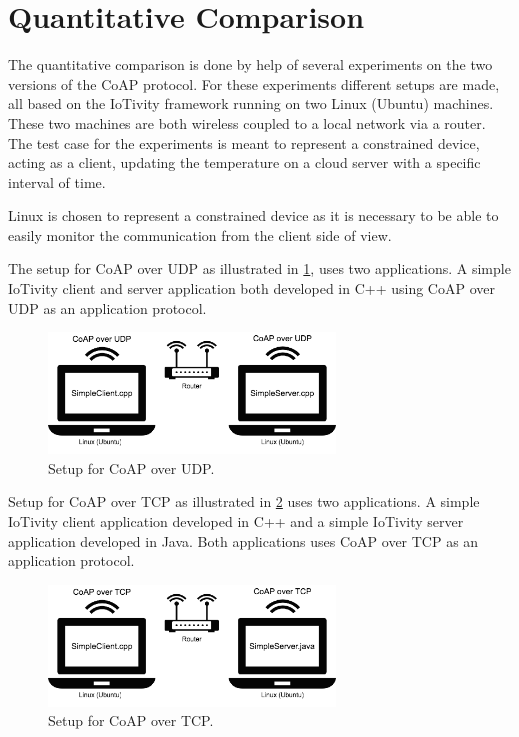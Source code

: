 \section{Quantitative Comparison}
The quantitative comparison is done by help of several experiments on the two versions of the CoAP protocol. For these experiments different setups are made, all based on the IoTivity framework running on two Linux (Ubuntu) machines. These two machines are both wireless coupled to a local network via a router. The test case for the experiments is meant to represent a constrained device, acting as a client, updating the temperature on a cloud server with a specific interval of time. 

Linux is chosen to represent a constrained device as it is necessary to be able to easily monitor the communication from the client side of view.

The setup for CoAP over UDP as illustrated in \figurename \ref{fig:setupudp}, uses two applications. A simple IoTivity client and server application both developed in C++ using CoAP over UDP as an application protocol.
\begin{figure}[!t]
	\centering
	\includegraphics[width=3in]{gfx/setupa}
	\caption{Setup for CoAP over UDP.}
	\label{fig:setupudp}
\end{figure}

Setup for CoAP over TCP as illustrated in \figurename \ref{fig:setuptcp} uses two applications. A simple IoTivity client application developed in C++ and a simple IoTivity server application developed in Java. Both applications uses CoAP over TCP as an application protocol.
\begin{figure}[!t]
	\centering
	\includegraphics[width=3in]{gfx/setupb}
	\caption{Setup for CoAP over TCP.}
	\label{fig:setuptcp}
\end{figure}


